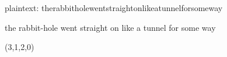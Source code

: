 
plaintext: therabbitholewentstraightonlikeatunnelforsomeway
  
the rabbit-hole went straight on like a tunnel for some way

(3,1,2,0)

    
